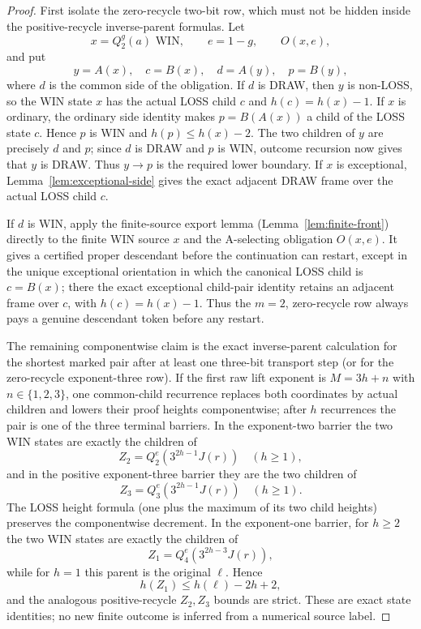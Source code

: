 \documentclass[11pt]{article}
\begin{document}
\begin{proof}
First isolate the zero-recycle two-bit row, which must not be hidden inside
the positive-recycle inverse-parent formulas.  Let
\[
 x=Q_2^g(a)\text{ WIN},\qquad e=1-g,\qquad O(x,e),
\]
and put
\[
 y=A(x),\quad c=B(x),\quad d=A(y),\quad p=B(y),
\]
where $d$ is the common side of the obligation.  If $d$ is DRAW, then $y$ is non-LOSS, so the WIN state $x$ has the
actual LOSS child $c$ and $h(c)=h(x)-1$.  If $x$ is ordinary, the ordinary
side identity makes $p=B(A(x))$ a child of the LOSS state $c$.  Hence $p$ is
WIN and $h(p)\le h(x)-2$.  The two children of $y$ are precisely $d$ and
$p$; since $d$ is DRAW and $p$ is WIN, outcome recursion now gives that $y$
is DRAW.  Thus $y\to p$ is the required lower boundary.  If $x$ is
exceptional, Lemma~\ref{lem:exceptional-side} gives the exact adjacent DRAW
frame over the actual LOSS child $c$.

If $d$ is WIN, apply the finite-source export lemma
(Lemma~\ref{lem:finite-front}) directly to the finite WIN source $x$ and the
A-selecting obligation $O(x,e)$.  It gives a certified proper descendant
before the continuation can restart, except in the unique exceptional
orientation in which the canonical LOSS child is $c=B(x)$; there the exact
exceptional child-pair identity retains an adjacent frame over $c$, with
$h(c)=h(x)-1$.  Thus the $m=2$, zero-recycle row always pays a genuine
descendant token before any restart.

The remaining componentwise claim is the exact inverse-parent calculation for
the shortest marked pair after at least one three-bit transport step (or for
the zero-recycle exponent-three row).  If the first raw lift exponent is $M=3h+n$ with
$n\in\{1,2,3\}$, one common-child recurrence replaces both coordinates by
actual children and lowers their proof heights componentwise; after $h$
recurrences the pair is one of the three terminal barriers.  In the
exponent-two barrier the two WIN states are exactly the children of
\[
 Z_2=Q_2^e(3^{2h-1}J(r))\quad(h\ge1),
\]
and in the positive exponent-three barrier they are the two children of
\[
 Z_3=Q_3^e(3^{2h-1}J(r))\quad(h\ge1).
\]
The LOSS height formula (one plus the maximum of its two child heights)
preserves the componentwise decrement.  In the exponent-one barrier, for
$h\ge2$ the two WIN states are exactly the children of
\[
 Z_1=Q_4^e(3^{2h-3}J(r)),
\]
while for $h=1$ this parent is the original $\ell$.  Hence
\[
 h(Z_1)\le h(\ell)-2h+2,
\]
and the analogous positive-recycle $Z_2,Z_3$ bounds are strict.  These are
exact state identities; no new finite outcome is inferred from a numerical
source label.


\end{proof}
\end{document}
